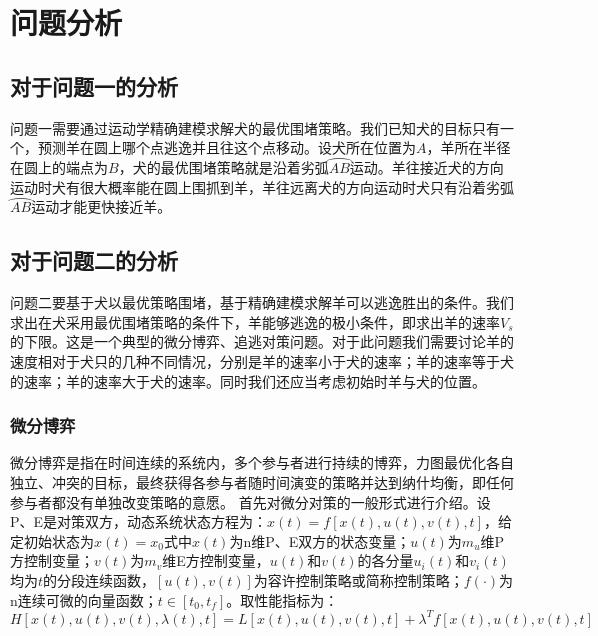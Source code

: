 \section{问题分析}
\subsection{对于问题一的分析}
问题一需要通过运动学精确建模求解犬的最优围堵策略。我们已知犬的目标只有一个，预测羊在圆上哪个点逃逸并且往这个点移动。设犬所在位置为$A$，羊所在半径在圆上的端点为$B$，犬的最优围堵策略就是沿着劣弧$\wideparen{AB}$运动。羊往接近犬的方向运动时犬有很大概率能在圆上围抓到羊，羊往远离犬的方向运动时犬只有沿着劣弧$\wideparen{AB}$运动才能更快接近羊。
\subsection{对于问题二的分析}
问题二要基于犬以最优策略围堵，基于精确建模求解羊可以逃逸胜出的条件。我们求出在犬采用最优围堵策略的条件下，羊能够逃逸的极小条件，即求出羊的速率$V_s$的下限。这是一个典型的微分博弈、追逃对策问题。对于此问题我们需要讨论羊的速度相对于犬只的几种不同情况，分别是羊的速率小于犬的速率；羊的速率等于犬的速率；羊的速率大于犬的速率。同时我们还应当考虑初始时羊与犬的位置。
\subsubsection{微分博弈}
微分博弈是指在时间连续的系统内，多个参与者进行持续的博弈，力图最优化各自独立、冲突的目标，最终获得各参与者随时间演变的策略并达到纳什均衡，即任何参与者都没有单独改变策略的意愿。
首先对微分对策的一般形式进行介绍。设P、E是对策双方，动态系统状态方程为：$x(t)=f[x(t),u(t),v(t),t]$，给定初始状态为$x(t)={{x}_{0}}$式中$x(t)$为n维P、E双方的状态变量；$u(t)$为$m_u$维P方控制变量；$v(t)$为$m_v$维E方控制变量，$u(t)$和$v(t)$的各分量$u_i(t)$和$v_i(t)$均为$t$的分段连续函数，$[u(t),v(t)]$为容许控制策略或简称控制策略；$f(\cdot)$为n连续可微的向量函数；$t\in[t_0,t_f]$。取性能指标为：
\begin{equation}
    H[x(t),u(t),v(t),\lambda (t),t]=L[x(t),u(t),v(t),t]+{{\lambda }^{T}}f[x(t),u(t),v(t),t]
\end{equation}
